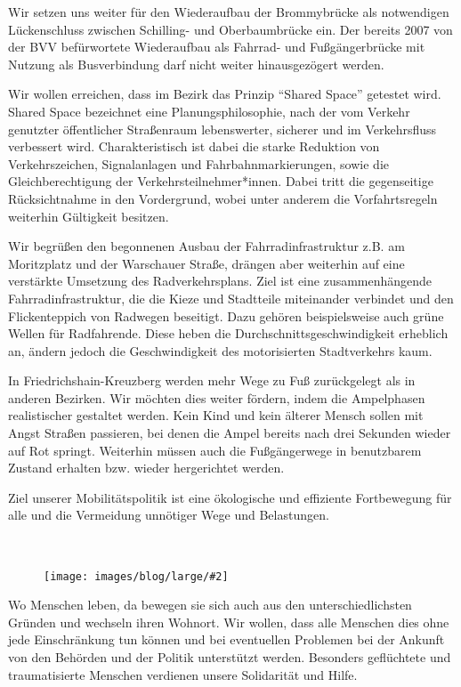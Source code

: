 \documentclass[a4paper,10pt]{article}
\newcommand{\mysection}[1]{{\vspace{1cm}\noindent\color{gray}{\ttfamily\LARGE\raggedright #1}\\\medskip}}
\newcommand{\abschnitt}[2]{%
\mysection{\raggedright #1}%
\begin{figure}[t]%
\vspace*{-2.7cm}%
\hspace*{-2.1cm}%
\texttt{[image: images/blog/large/\#2]} %
\end{figure}%
}
\begin{document}
Wir setzen uns weiter für den Wiederaufbau der Brommybrücke als
notwendigen Lückenschluss zwischen Schilling- und Oberbaumbrücke ein.
Der bereits 2007 von der BVV befürwortete Wiederaufbau als Fahrrad- und
Fußgängerbrücke mit Nutzung als Busverbindung darf nicht weiter
hinausgezögert werden.

Wir wollen erreichen, dass im Bezirk das Prinzip ``Shared Space''
getestet wird. Shared Space bezeichnet eine Planungsphilosophie, nach
der vom Verkehr genutzter öffentlicher Straßenraum lebenswerter,
sicherer und im Verkehrsfluss verbessert wird. Charakteristisch ist
dabei die starke Reduktion von Verkehrszeichen, Signalanlagen und
Fahrbahnmarkierungen, sowie die Gleichberechtigung der
Verkehrsteilnehmer*innen. Dabei tritt die gegenseitige Rücksichtnahme in
den Vordergrund, wobei unter anderem die Vorfahrtsregeln weiterhin
Gültigkeit besitzen.

Wir begrüßen den begonnenen Ausbau der Fahrradinfrastruktur z.B. am
Moritzplatz und der Warschauer Straße, drängen aber weiterhin auf eine
verstärkte Umsetzung des Radverkehrsplans. Ziel ist eine
zusammenhängende Fahrradinfrastruktur, die die Kieze und Stadtteile
miteinander verbindet und den Flickenteppich von Radwegen beseitigt.
Dazu gehören beispielsweise auch grüne Wellen für Radfahrende. Diese
heben die Durchschnittsgeschwindigkeit erheblich an, ändern jedoch die
Geschwindigkeit des motorisierten Stadtverkehrs kaum.


\enlargethispage{2em}
In Friedrichshain-Kreuzberg werden mehr Wege zu Fuß zurückgelegt als in
anderen Bezirken. Wir möchten dies weiter fördern, indem die Ampelphasen
realistischer gestaltet werden. Kein Kind und kein älterer Mensch sollen
mit Angst Straßen passieren, bei denen die Ampel bereits nach drei
Sekunden wieder auf Rot springt. Weiterhin müssen auch die Fußgängerwege
in benutzbarem Zustand erhalten bzw. wieder hergerichtet werden.

Ziel unserer Mobilitätspolitik ist eine ökologische und effiziente
Fortbewegung für alle und die Vermeidung unnötiger Wege und Belastungen.

\clearpage
\abschnitt{Migration}{plakat_gcar}

Wo Menschen leben, da bewegen sie sich auch aus den unterschiedlichsten
Gründen und wechseln ihren Wohnort. Wir wollen, dass alle Menschen dies
ohne jede Einschränkung tun können und bei eventuellen Problemen bei der
Ankunft von den Behörden und der Politik unterstützt werden. Besonders
geflüchtete und traumatisierte Menschen verdienen unsere Solidarität und
Hilfe.
\end{document}
